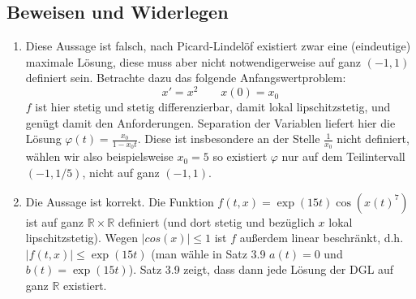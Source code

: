 \documentclass{article}
\def\R{\ensuremath{\mathbb{R}}}
\let\oldphi\phi
\let\phi\varphi
\let\varphi\oldphi
\begin{document}
\subsection{Beweisen und Widerlegen}

\begin{enumerate}
	\item Diese Aussage ist falsch, nach Picard-Lindelöf existiert zwar eine (eindeutige) maximale Lösung, diese muss aber nicht notwendigerweise auf ganz $(-1, 1)$ definiert sein. Betrachte dazu das folgende Anfangswertproblem:
	      \begin{equation*}
		      x' = x^2 \qquad x(0) = x_0
	      \end{equation*}
	      $f$ ist hier stetig und stetig differenzierbar, damit lokal lipschitzstetig, und genügt damit den Anforderungen. Separation der Variablen liefert hier die Lösung $\phi(t) = \frac{x_0}{1 - x_0 t}$. Diese ist insbesondere an der Stelle $\frac{1}{x_0}$ nicht definiert, wählen wir also beispielsweise $x_0 = 5$ so existiert $\phi$ nur auf dem Teilintervall $(-1, 1/5)$, nicht auf ganz $(-1,1)$.
	\item Die Aussage ist korrekt. Die Funktion $f(t,x) = \exp(15 t) \cos(x(t)^7)$ ist auf ganz $\R \times \R$ definiert (und dort stetig und bezüglich $x$ lokal lipschitzstetig). Wegen $|cos(x)| \leq 1$ ist $f$ außerdem linear beschränkt, d.h. $|f(t,x)| \leq \exp(15 t)$ (man wähle in Satz 3.9 $a(t)  = 0$ und $b(t) = \exp(15 t)$). Satz 3.9 zeigt, dass dann jede Lösung der DGL auf ganz $\R$ existiert.
\end{enumerate}
\end{document}
